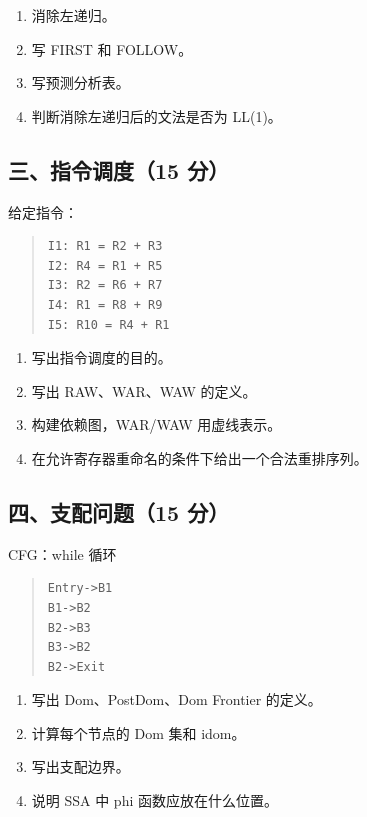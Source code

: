 \documentclass[UTF8,zihao=-4]{ctexart}
\begin{document}
\begin{enumerate}
\item 消除左递归。
\item 写 FIRST 和 FOLLOW。
\item 写预测分析表。
\item 判断消除左递归后的文法是否为 LL(1)。
\end{enumerate}


\subsection{三、指令调度（15 分）}


给定指令：


\begin{quote}
\footnotesize
\begin{verbatim}
I1: R1 = R2 + R3
I2: R4 = R1 + R5
I3: R2 = R6 + R7
I4: R1 = R8 + R9
I5: R10 = R4 + R1
\end{verbatim}
\end{quote}


\begin{enumerate}
\item 写出指令调度的目的。
\item 写出 RAW、WAR、WAW 的定义。
\item 构建依赖图，WAR/WAW 用虚线表示。
\item 在允许寄存器重命名的条件下给出一个合法重排序列。
\end{enumerate}


\subsection{四、支配问题（15 分）}


CFG：while 循环


\begin{quote}
\footnotesize
\begin{verbatim}
Entry->B1
B1->B2
B2->B3
B3->B2
B2->Exit
\end{verbatim}
\end{quote}


\begin{enumerate}
\item 写出 Dom、PostDom、Dom Frontier 的定义。
\item 计算每个节点的 Dom 集和 idom。
\item 写出支配边界。
\item 说明 SSA 中 phi 函数应放在什么位置。
\end{enumerate}
\end{document}
